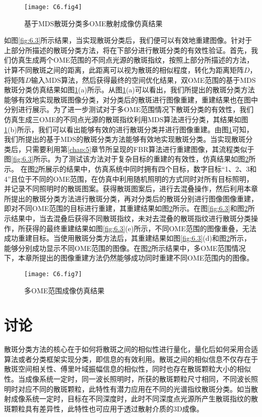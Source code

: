 \begin{figure}[htp!]
	\centering
	\texttt{[image: C6.fig4]}
	\caption{基于MDS散斑分类多OME散射成像仿真结果}
	\label{fig:6.4}
\end{figure}

如图\ref{fig:6.3}所示结果，当实现散斑分类后，我们便可以有效地重建图像。针对于上部分所描述的散斑分类方法，将在下部分进行散斑分类的有效性验证。首先，我们仿真生成两个OME范围的不同点光源的散斑指纹，按照上部分所描述的方法，计算不同散斑之间的距离，此距离可以视为散斑的相似程度，转化为距离矩阵$D$，将矩阵$D$输入MDS算法，然后获得最终的空间优化结果，双OME范围的基于MDS散斑分类仿真结果如图\ref{fig:6.4}(a)所示。从图\ref{fig:6.4}(a)可以看出，我们所提出的散斑分类方法能够有效地实现散斑图像分类，对分类后的散斑进行图像重建，重建结果也在图中分别进行展示。为了进一步测试对于多OME范围情况下散斑分类的有效性，我们仿真生成三OME的不同点光源的散斑指纹利用MDS算法进行分类，其结果如图\ref{fig:6.4}(b)所示，我们可以看出能够有效的进行散斑分类并进行图像重建。由图\ref{fig:6.4}可知，我们所提出的基于MDS的散斑分类方法能够有效地实现散斑分类。当实现散斑分类后，只需要利用第\ref{chap:5}章节所呈现的FBR算法进行重建图像，其流程类似于图\ref{fig:6.3}所示。为了测试该方法对于复杂目标的重建的有效性，仿真结果如图\ref{fig:6.7}所示。
在图\ref{fig:6.7}所展示的结果中，仿真系统中同时拥有四个目标，数字目标“1、2、3和4”且位于不同的OME范围，在仿真中利用随机照明的方式同时对所有目标照明，并记录不同照明时的散斑图案。获得散斑图案后，进行去混叠操作，然后利用本章所提出的散斑分类方法进行散斑分类，再对分类后的散斑分别进行图像图像重建，即对不同OME范围的目标进行重建，其重建结果如图\ref{fig:6.7}所示。在图\ref{fig:6.3}和图\ref{fig:6.7}所示结果中，当去混叠后获得不同散斑指纹，未对去混叠的散斑指纹进行散斑分类操作，所获得的最终重建结果如图\ref{fig:6.3}(e)所示，不同OME范围的图像重叠，无法成功重建目标。当使用散斑分类方法后，其重建结果如图\ref{fig:6.3}(d)和图\ref{fig:6.7}所示，能够分别成功显示不同OME范围的图像。在图\ref{fig:6.7}所示结果中，多OME范围情况下，本章所提出的图像重建方法仍然能够成功同时重建不同OME范围内的图像。

\begin{figure}[htp]
	\centering
	\texttt{[image: C6.fig7]}
	\caption{多OME范围成像仿真结果}
	\label{fig:6.7}
\end{figure}

\section{讨论}

散斑分类方法的核心在于如何将散斑之间的相似性进行量化，量化后如何采用合适算法或者分类框架实现分类，即信息的有效利用。散斑之间的相似信息不仅存在于散斑空间相关性、傅里叶域振幅信息的相似性，同时也存在散斑颗粒大小的相似性。当成像系统一定时，同一波长照明时，所获的散斑颗粒尺寸相同，不同波长照明时对应不同的散斑颗粒，此特性有潜力应用在不同的光谱指纹散斑分类。如当散射成像系统一定时，目标在不同深度时，此时不同深度点光源所产生散斑指纹的散斑颗粒具有差异性，此特性也可应用于透过散射介质的3D成像。


